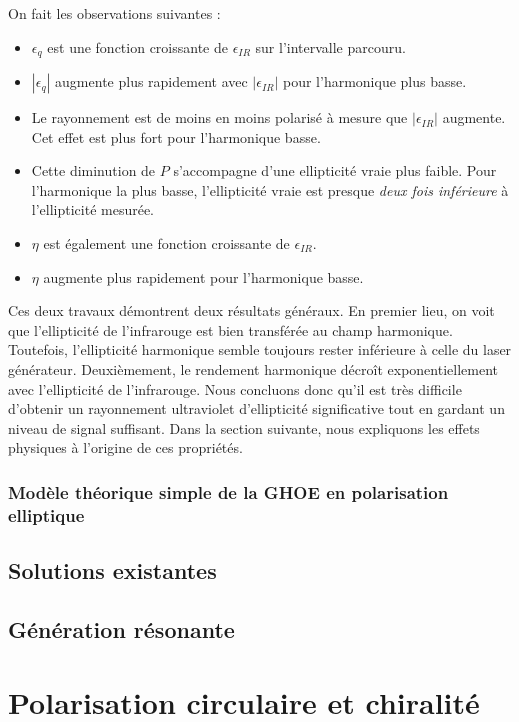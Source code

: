 On fait les observations suivantes :
\begin{itemize}
\renewcommand{\labelitemi}{$\bullet$}
\setlength\itemsep{1em}
\item $\epsilon_q$ est une fonction croissante de $\epsilon_{IR}$ sur l'intervalle parcouru.
\item $|\epsilon_q|$ augmente plus rapidement avec $|\epsilon_{IR}|$ pour l'harmonique plus basse.
\item Le rayonnement est de moins en moins polarisé à mesure que $|\epsilon_{IR}|$ augmente. Cet effet est plus fort pour l'harmonique basse.
\item Cette diminution de $P$ s'accompagne d'une ellipticité vraie plus faible. Pour l'harmonique la plus basse, l'ellipticité vraie est presque \textit{deux fois inférieure} à l'ellipticité mesurée.
\item $\eta$ est également une fonction croissante de $\epsilon_{IR}$.
\item $\eta$ augmente plus rapidement pour l'harmonique basse.
\end{itemize}
\vspace{\baselineskip}
Ces deux travaux démontrent deux résultats généraux. En premier lieu, on voit que l'ellipticité de l'infrarouge est bien transférée au champ harmonique. Toutefois, l'ellipticité harmonique semble toujours rester inférieure à celle du laser générateur. Deuxièmement, le rendement harmonique décroît exponentiellement avec l'ellipticité de l'infrarouge. Nous concluons donc qu'il est très difficile d'obtenir un rayonnement ultraviolet d'ellipticité significative tout en gardant un niveau de signal suffisant. Dans la section suivante, nous expliquons les effets physiques à l'origine de ces propriétés.

\subsection{Modèle théorique simple de la GHOE en polarisation elliptique}

\section{Solutions existantes}
\section{Génération résonante}

\chapter{Polarisation circulaire et chiralité}
